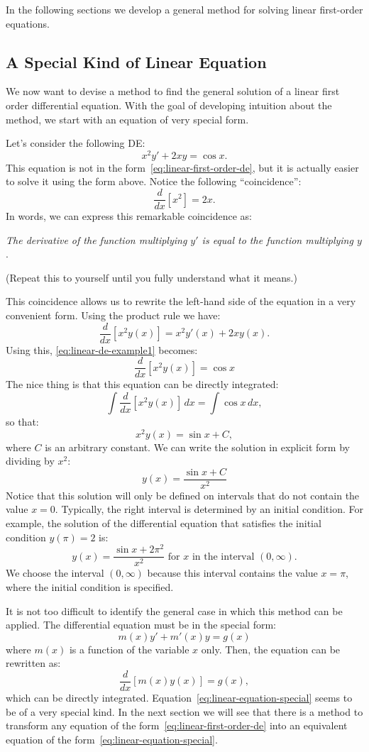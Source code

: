 \documentclass{ximera}
\begin{document}
In the following sections we develop a general method for solving linear first-order equations.

\subsection*{A Special Kind of Linear Equation}
We now want to devise a method to find the general solution of a linear first order differential equation. With the goal of developing intuition about the method, we start with an equation of very special form.

Let's consider the following DE:
\begin{equation}
\label{eq:linear-de-example1}
x^2y'+2xy=\cos x.
\end{equation}
This equation is not in the form~\ref{eq:linear-first-order-de}, but it is actually easier to solve it using the form above. Notice the following ``coincidence'':
\[
\frac{d}{dx}[x^2]=2x.
\]
In words, we can express this remarkable coincidence as:

\begin{center}
\emph{The derivative of the function multiplying $y'$ is equal to the function multiplying $y$}. 
\end{center}

(Repeat this to yourself until you fully understand what it means.)

This coincidence allows us to rewrite the left-hand side of the equation in a very convenient form. Using the product rule we have:
\[
\frac{d}{dx}\left[x^2y(x)\right]=x^2y'(x)+2xy(x).
\]
Using this, \ref{eq:linear-de-example1} becomes:
\[
\frac{d}{dx}\left[x^2y(x)\right]=\cos x
\]
The nice thing is that this equation can be directly integrated:
\[
\int \frac{d}{dx}\left[x^2y(x)\right]\, dx = \int \cos x\,dx,
\]
so that:
\[
x^2y(x)=\sin x + C,
\]
where $C$ is an arbitrary constant. We can write the solution in explicit form by dividing by $x^2$:
\[
y(x)=\frac{\sin x + C}{x^2}
\]
Notice that this solution will only be defined on intervals that do not contain the value $x=0$. Typically, the right interval is determined by an initial condition. For example, the solution of the differential equation that satisfies the initial condition $y(\pi)=2$ is:
\[
y(x)=\frac{\sin x + 2\pi^2}{x^2}\text{ for $x$ in the interval $(0,\infty)$}.
\]
We choose the interval $(0,\infty)$ because this interval contains the value $x=\pi$, where the initial condition is specified.

It is not too difficult to identify the general case in which this method can be applied. The differential equation must be in the special form:
\begin{equation}
\label{eq:linear-equation-special}
m(x)y'+m'(x)y=g(x)
\end{equation}
where $m(x)$ is a function of the variable $x$ only. Then, the equation can be rewritten as:
\[
\frac{d}{dx}\left[m(x)y(x)\right]=g(x),
\]
which can be directly integrated. Equation~\ref{eq:linear-equation-special} seems to be of a very special kind. In the next section we will see that there is a method to transform any equation of the form~\ref{eq:linear-first-order-de} into an equivalent equation of the form~\ref{eq:linear-equation-special}.
\end{document}
